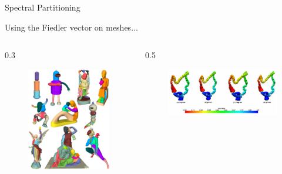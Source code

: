 \documentclass{beamer}
\begin{document}
\begin{frame}{Spectral Partitioning}
    \begin{center}
        Using the Fiedler vector on meshes$\ldots$
    \end{center}
    \begin{columns}
        \begin{column}{0.3\pagewidth}
            \begin{figure}
                \centering
                \includegraphics[width=\textwidth]{spectral_partitioning.png}
            \end{figure}
        \end{column}
        \begin{column}{0.5\pagewidth}
            \begin{figure}
                \centering
                \includegraphics[width=\textwidth]{fielder_vector_colon.png}
            \end{figure}
        \end{column}
    \end{columns}
\end{frame}
    
\end{document}
